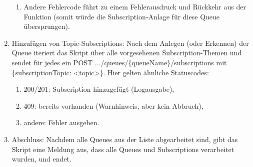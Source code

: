 \begin{enumerate}
\begin{enumerate}
        \item Andere Fehlercode führt zu einem Fehlerausdruck und Rückkehr aus der Funktion (somit würde die Subscription-Anlage für diese Queue übersprungen).
    \end{enumerate}
    \item Hinzufügen von Topic-Subscriptions: Nach dem Anlegen (oder Erkennen) der Queue iteriert das Skript über alle vorgesehenen Subscription-Themen und sendet für jedes ein POST .../queues/\{queueName\}/subscriptions mit \{\grqq subscriptionTopic\grqq{}: \grqq <topic>\grqq \}. Hier gelten ähnliche Statuscodes:
    \begin{enumerate}
        \item 200/201: Subscription hinzugefügt (Logausgabe),
        \item 409: bereits vorhanden (Warnhinweis, aber kein Abbruch),
        \item andere: Fehler ausgeben.
    \end{enumerate}
    \item Abschluss: Nachdem alle Queues aus der Liste abgearbeitet sind, gibt das Skript eine Meldung aus, dass alle Queues und Subscriptions verarbeitet wurden, und endet.
\end{enumerate}
